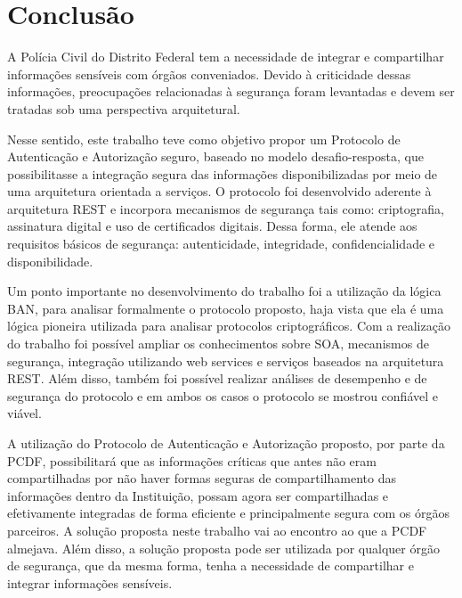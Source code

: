 \chapter{Conclusão}%

A Polícia Civil do Distrito Federal tem a necessidade de integrar e compartilhar informações sensíveis com órgãos conveniados. Devido à criticidade dessas informações, preocupações relacionadas à segurança foram levantadas e devem ser tratadas sob uma perspectiva arquitetural.

Nesse sentido, este trabalho teve como objetivo propor um Protocolo de Autenticação e Autorização seguro, baseado no modelo desafio-resposta, que possibilitasse a integração segura das informações disponibilizadas por meio de uma arquitetura orientada a serviços. O protocolo foi desenvolvido aderente à arquitetura REST e incorpora mecanismos de segurança tais como: criptografia, assinatura digital e uso de certificados digitais. Dessa forma, ele atende aos requisitos básicos de segurança: autenticidade, integridade, confidencialidade e disponibilidade.

Um ponto importante no desenvolvimento do trabalho foi a utilização da lógica BAN, para analisar formalmente o protocolo proposto, haja vista que ela é uma lógica pioneira utilizada para analisar protocolos criptográficos. Com a realização do trabalho foi possível ampliar os conhecimentos sobre SOA, mecanismos de segurança, integração utilizando web services e serviços baseados na arquitetura REST. Além disso, também foi possível realizar análises de desempenho e de segurança do protocolo e em ambos os casos o protocolo se mostrou confiável e viável.

A utilização do Protocolo de Autenticação e Autorização proposto, por parte da PCDF, possibilitará que as informações críticas que antes não eram compartilhadas por não haver formas seguras de compartilhamento das informações dentro da Instituição, possam agora ser compartilhadas e efetivamente integradas de forma eficiente e principalmente segura com os órgãos parceiros. A solução proposta neste trabalho vai ao encontro ao que a PCDF almejava. Além disso, a solução proposta pode ser utilizada por qualquer órgão de segurança, que da mesma forma, tenha a necessidade de compartilhar e integrar informações sensíveis.

